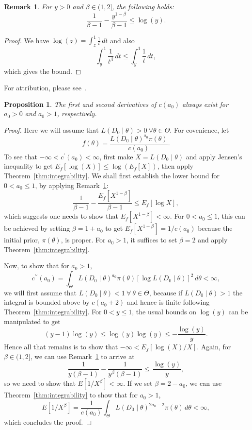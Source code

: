 \documentclass[a4paper, notitlepage, 11pt]{article}
\newtheorem{proposition}{Proposition}[]
\newtheorem{remark}{Remark}[]
\begin{document}
\begin{remark}
 \label{rmk:log_inequality}
 For $y > 0$ and $\beta \in (1, 2]$, the following holds:
 \begin{equation}
  \label{eq:log_bound}
  \frac{1}{\beta - 1} - \frac{y^{1-\beta}}{\beta - 1} \leq \log(y).
 \end{equation}
\end{remark}
\begin{proof}
 We have $\log(z) = \int_{z}^1 \frac{1}{t}\,dt$ and also
 \[ \int_{y}^1 \frac{1}{t^\beta}\,dt \leq \int_{y}^1 \frac{1}{t}\,dt, \] 
 which gives the bound.
\end{proof}
For attribution, please see~\cite{macavity2016}.

\begin{proposition}
\label{prop:c_is_C2}
The first and second derivatives of $c(a_0)$ always exist for $a_0 > 0$ and $a_0 > 1$, respectively. 
\end{proposition}
\begin{proof}
Here we will assume that $L(D_0 \mid \theta) > 0\: \forall \theta \in \Theta$.
For covenience, let
\[  f(\theta) = \frac{L(D_0 \mid \theta)^{a_0} \pi(\theta)}{c(a_0)}. \]
To see that $-\infty < c^\prime(a_0)  < \infty$, first make $ X = L( D_0 \mid \theta)$ and  apply Jensen's inequality to get $E_f[\log(X)] \leq \log\left(E_f[X]\right)$, then apply Theorem~\ref{thm:integrability}.
We shall first establish the lower bound for $ 0 < a_0 \leq 1$, by applying Remark~\ref{rmk:log_inequality}:
\[\frac{1}{\beta - 1} - \frac{E_f[X^{1-\beta}]}{\beta - 1} \leq E_f[\log X], \] 
which suggests one needs to show that $E_f[X^{1-\beta}] < \infty$.
For $ 0 < a_0 \leq 1$, this can be achieved by setting $\beta = 1  + a_0$ to get $E_f[X^{1-\beta}] = 1/c(a_0)$ because the initial prior, $\pi(\theta)$, is proper.
For $a_0 > 1$, it suffices to set $\beta = 2$ and apply Theorem~\ref{thm:integrability}.

Now, to show that for $a_0 > 1$,
\[ c^{\prime\prime}(a_0) = \int_{\Theta} L(D_0 \mid \theta)^{a_0} \pi(\theta) [\log L(D_0 \mid \theta)]^2 \, d\theta < \infty, \]
we will first assume that $L(D_0 \mid \theta) < 1 \: \forall\: \theta \in \Theta$, because if $L(D_0 \mid \theta) > 1$ the integral is bounded above by $c(a_0 + 2)$ and hence is finite following Theorem~\ref{thm:integrability}.
For $0 < y \leq 1$, the usual bounds on $\log(y)$ can be manipulated to get 
$$ (y-1)\log(y) \leq \log(y)\log(y) \leq - \frac{\log(y)}{y} . $$
Hence all that remains is to show that $ - \infty < E_f[\log(X)/X]$.
Again, for $\beta \in (1, 2]$, we can use Remark~\ref{rmk:log_inequality} to arrive at
\[ \frac{1}{y(\beta - 1)} - \frac{1}{y^{\beta}(\beta - 1)} \leq\, \frac{\log(y)}{y}, \]
so we need to show that $E[1/X^\beta] < \infty$.
If we set $\beta = 2 - a_0$, we can use Theorem~\ref{thm:integrability} to show that for $ a_0 > 1$,
\[ E[1/X^\beta] = \frac{1}{c(a_0)}\int_{\Theta} L(D_0 \mid \theta)^{2a_0 - 2} \pi(\theta) \,d\theta < \infty, \]
which concludes the proof.
\end{proof}
\end{document}
